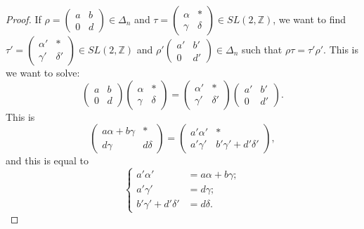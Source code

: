 \documentclass{article}
\begin{document}
\begin{proof}
    If $\rho=\begin{pmatrix}
        a&b\\
        0&d
    \end{pmatrix} \in \Delta_n$ and $\tau=\begin{pmatrix}
        \alpha&*\\
        \gamma&\delta
    \end{pmatrix} \in SL(2,\mathbb{Z})$, we want to find $\tau'= \begin{pmatrix}
        \alpha'&*\\
        \gamma'&\delta'
    \end{pmatrix} \in SL(2,\mathbb{Z})$ and $\rho'\begin{pmatrix}
        a'&b'\\
        0&d'
    \end{pmatrix} \in \Delta_n$ such that $\rho \tau =\tau' \rho'$. This is we want to solve:\[
    \begin{pmatrix}
        a&b\\
        0&d
    \end{pmatrix}
    \begin{pmatrix}
        \alpha&*\\
        \gamma&\delta
    \end{pmatrix}=
    \begin{pmatrix}
        \alpha'&*\\
        \gamma'&\delta'
    \end{pmatrix}
    \begin{pmatrix}
        a'&b'\\
        0&d'
    \end{pmatrix}.
    \]
    This is \[
    \begin{pmatrix}
        a\alpha+b\gamma&*\\
        d\gamma&d\delta
    \end{pmatrix}=
    \begin{pmatrix}
        a'\alpha'&*\\
        a'\gamma'&b'\gamma'+d'\delta'
    \end{pmatrix},
    \]
    and this is equal to
    \begin{equation*}
        \begin{cases}
            a'\alpha'&=a\alpha+b\gamma;\\
            a'\gamma'&=d\gamma;\\
            b'\gamma'+d'\delta'&=d\delta.
        \end{cases}

\end{equation*}
\end{proof}
\end{document}

